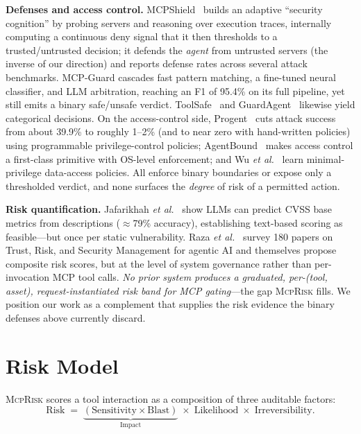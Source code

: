 \documentclass[conference]{IEEEtran}
\newcommand{\framework}{\textsc{McpRisk}}
\begin{document}
\noindent\textbf{Defenses and access control.}
MCPShield~\cite{zhou2026mcpshield} builds an adaptive ``security cognition'' by
probing servers and reasoning over execution traces, internally computing a
continuous deny signal that it then thresholds to a trusted/untrusted decision; it
defends the \emph{agent} from untrusted servers (the inverse of our direction) and
reports defense rates across several attack benchmarks. MCP-Guard
\cite{xing2026mcp_guard} cascades fast pattern matching, a fine-tuned neural
classifier, and LLM arbitration, reaching an F1 of 95.4\% on its full pipeline,
yet still emits a binary safe/unsafe verdict. ToolSafe~\cite{mou2026toolsafe} and
GuardAgent~\cite{xiang2025guardagent} likewise yield categorical decisions. On the
access-control side, Progent~\cite{shi2025progent} cuts attack success from about
39.9\% to roughly 1--2\% (and to near zero with hand-written policies) using
programmable privilege-control policies; AgentBound~\cite{buhler2025agentbound}
makes access control a first-class primitive with OS-level enforcement; and Wu
\emph{et al.}~\cite{wu2025automating_data_access} learn minimal-privilege
data-access policies. All enforce binary boundaries or expose only a thresholded
verdict, and none surfaces the \emph{degree} of risk of a permitted action.

\noindent\textbf{Risk quantification.}
Jafarikhah \emph{et al.}~\cite{jafarikhah2026description_to_score} show LLMs can
predict CVSS base metrics from descriptions ($\approx$79\% accuracy), establishing
text-based scoring as feasible---but once per static vulnerability. Raza
\emph{et al.}~\cite{raza2025trism} survey 180 papers on Trust, Risk, and Security
Management for agentic AI and themselves propose composite risk scores, but at the
level of system governance rather than per-invocation MCP tool calls. \emph{No
prior system produces a graduated, per-(tool, asset), request-instantiated risk
band for MCP gating}---the gap \framework{} fills. We position our work as a
complement that supplies the risk evidence the binary defenses above currently
discard.

\section{Risk Model}
\label{sec:model}

\framework{} scores a tool interaction as a composition of three auditable
factors:
\begin{equation}
\text{Risk} \;=\; \underbrace{(\text{Sensitivity}\times\text{Blast})}_{\text{Impact}} \;\times\; \text{Likelihood} \;\times\; \text{Irreversibility}.
\label{eq:risk}
\end{equation}
\end{document}
